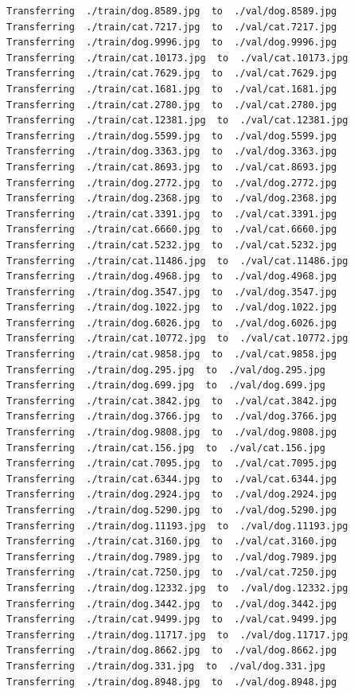\documentclass[]{book}
\theoremstyle{definition}
\theoremstyle{definition}
\theoremstyle{definition}
\theoremstyle{remark}
\begin{document}
\begin{verbatim}
Transferring  ./train/dog.8589.jpg  to  ./val/dog.8589.jpg
Transferring  ./train/cat.7217.jpg  to  ./val/cat.7217.jpg
Transferring  ./train/dog.9996.jpg  to  ./val/dog.9996.jpg
Transferring  ./train/cat.10173.jpg  to  ./val/cat.10173.jpg
Transferring  ./train/cat.7629.jpg  to  ./val/cat.7629.jpg
Transferring  ./train/cat.1681.jpg  to  ./val/cat.1681.jpg
Transferring  ./train/cat.2780.jpg  to  ./val/cat.2780.jpg
Transferring  ./train/cat.12381.jpg  to  ./val/cat.12381.jpg
Transferring  ./train/dog.5599.jpg  to  ./val/dog.5599.jpg
Transferring  ./train/dog.3363.jpg  to  ./val/dog.3363.jpg
Transferring  ./train/cat.8693.jpg  to  ./val/cat.8693.jpg
Transferring  ./train/dog.2772.jpg  to  ./val/dog.2772.jpg
Transferring  ./train/dog.2368.jpg  to  ./val/dog.2368.jpg
Transferring  ./train/cat.3391.jpg  to  ./val/cat.3391.jpg
Transferring  ./train/cat.6660.jpg  to  ./val/cat.6660.jpg
Transferring  ./train/cat.5232.jpg  to  ./val/cat.5232.jpg
Transferring  ./train/cat.11486.jpg  to  ./val/cat.11486.jpg
Transferring  ./train/dog.4968.jpg  to  ./val/dog.4968.jpg
Transferring  ./train/dog.3547.jpg  to  ./val/dog.3547.jpg
Transferring  ./train/dog.1022.jpg  to  ./val/dog.1022.jpg
Transferring  ./train/dog.6026.jpg  to  ./val/dog.6026.jpg
Transferring  ./train/cat.10772.jpg  to  ./val/cat.10772.jpg
Transferring  ./train/cat.9858.jpg  to  ./val/cat.9858.jpg
Transferring  ./train/dog.295.jpg  to  ./val/dog.295.jpg
Transferring  ./train/dog.699.jpg  to  ./val/dog.699.jpg
Transferring  ./train/cat.3842.jpg  to  ./val/cat.3842.jpg
Transferring  ./train/dog.3766.jpg  to  ./val/dog.3766.jpg
Transferring  ./train/dog.9808.jpg  to  ./val/dog.9808.jpg
Transferring  ./train/cat.156.jpg  to  ./val/cat.156.jpg
Transferring  ./train/cat.7095.jpg  to  ./val/cat.7095.jpg
Transferring  ./train/cat.6344.jpg  to  ./val/cat.6344.jpg
Transferring  ./train/dog.2924.jpg  to  ./val/dog.2924.jpg
Transferring  ./train/dog.5290.jpg  to  ./val/dog.5290.jpg
Transferring  ./train/dog.11193.jpg  to  ./val/dog.11193.jpg
Transferring  ./train/cat.3160.jpg  to  ./val/cat.3160.jpg
Transferring  ./train/dog.7989.jpg  to  ./val/dog.7989.jpg
Transferring  ./train/cat.7250.jpg  to  ./val/cat.7250.jpg
Transferring  ./train/dog.12332.jpg  to  ./val/dog.12332.jpg
Transferring  ./train/dog.3442.jpg  to  ./val/dog.3442.jpg
Transferring  ./train/cat.9499.jpg  to  ./val/cat.9499.jpg
Transferring  ./train/dog.11717.jpg  to  ./val/dog.11717.jpg
Transferring  ./train/dog.8662.jpg  to  ./val/dog.8662.jpg
Transferring  ./train/dog.331.jpg  to  ./val/dog.331.jpg
Transferring  ./train/dog.8948.jpg  to  ./val/dog.8948.jpg

\end{verbatim}
\end{document}
